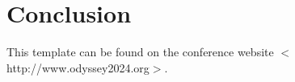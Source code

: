 \documentclass[a4paper]{article}
\begin{document}
\section{Conclusion}
This template can be found on the conference website
$<$http://www.odyssey2024.org$>$.




%
\end{document}
